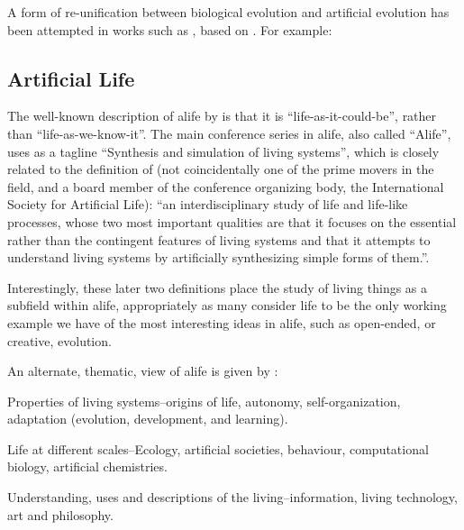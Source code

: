 A form of re-unification between biological evolution and artificial evolution has been attempted in works such as \parencite{Paixao2015}, based on . For example: 

\subsection{Artificial Life}\label{alife}
The well-known description of \gls{alife} by \textcite{Langton1989} is that it is ``life-as-it-could-be'', rather than ``life-as-we-know-it''. The main conference series in \gls{alife}, also called ``Alife'', uses as a tagline ``Synthesis and simulation of living systems'', which is closely related to the definition of \textcite{Bedau:2007ga} (not coincidentally one of the prime movers in the field, and a board member of the conference organizing body, the International Society for Artificial Life): ``an interdisciplinary study of life and life-like processes, whose two most important qualities are that it focuses on the essential rather than the contingent features of living systems and that it attempts to understand living systems by artificially synthesizing simple forms of them.''. 

Interestingly, these later two definitions place the study of living things as a subfield within \gls{alife}, appropriately as many consider life to be the only working example we have of the most interesting ideas in \gls{alife}, such as open-ended, or creative, evolution.

An alternate, thematic, view of \gls{alife} is given by \textcite{Aguilar2014}:
\begin{compactitem}
\item Properties of living systems--origins of life, autonomy, self-organization, adaptation (evolution, development, and learning).
\item Life at different scales--Ecology, artificial societies, behaviour, computational biology, artificial chemistries.
\item Understanding, uses and descriptions of the living--information, living technology, art and philosophy.
\end{compactitem}

